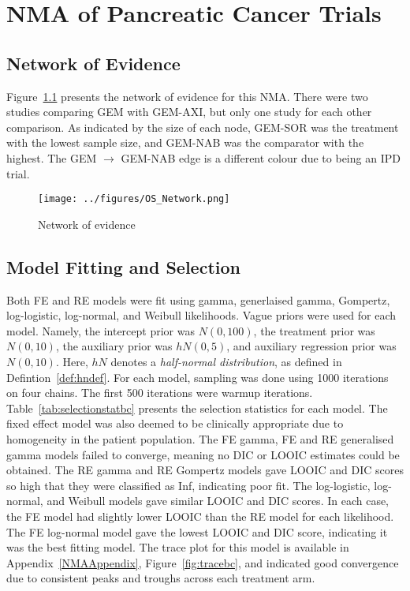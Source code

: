 \chapter{NMA of Pancreatic Cancer Trials}\label{nmachap}

\section{Network of Evidence}
Figure~\ref{fig:osnet} presents the network of evidence for this NMA. There were two studies comparing GEM with GEM-AXI, but only one study for each other comparison. As indicated by the size of each node, GEM-SOR was the treatment with the lowest sample size, and GEM-NAB was the comparator with the highest. The GEM $\to$ GEM-NAB edge is a different colour due to being an IPD trial. 

\begin{figure}[h]
    \centering
    \texttt{[image: ../figures/OS\_Network.png]}
    \caption{Network of evidence}
    \label{fig:osnet}
\end{figure}

\section{Model Fitting and Selection}
Both FE and RE models were fit using gamma, generlaised gamma, Gompertz, log-logistic, log-normal, and Weibull likelihoods. Vague priors were used for each model. Namely, the intercept prior was $N(0, 100)$, the treatment prior was $N(0, 10)$, the auxiliary prior was $hN(0, 5)$, and auxiliary regression prior was $N(0, 10)$. Here, $hN$ denotes a \textit{half-normal distribution}, as defined in Defintion~\ref{def:hndef}. For each model, sampling was done using 1000 iterations on four chains. The first 500 iterations were warmup iterations. \\

Table~\ref{tab:selectionstatbc} presents the selection statistics for each model. The fixed effect model was also deemed to be clinically appropriate due to homogeneity in the patient population. The FE gamma, FE and RE generalised gamma models failed to converge, meaning no DIC or LOOIC estimates could be obtained. The RE gamma and RE Gompertz models gave LOOIC and DIC scores so high that they were classified as Inf, indicating poor fit. The log-logistic, log-normal, and Weibull models gave similar LOOIC and DIC scores. In each case, the FE model had slightly lower LOOIC than the RE model for each likelihood. The FE log-normal model gave the lowest LOOIC and DIC score, indicating it was the best fitting model. The trace plot for this model is available in Appendix~\ref{NMAAppendix}, Figure~\ref{fig:tracebc}, and indicated good convergence due to consistent peaks and troughs across each treatment arm. \\

